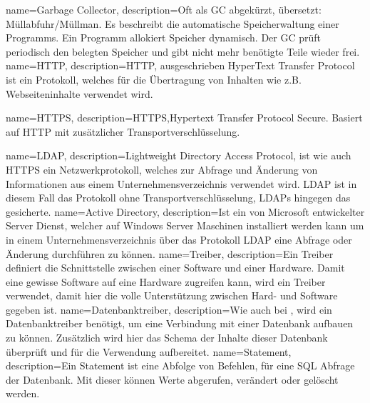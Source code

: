{
  name=Garbage Collector,
  description={Oft als GC abgekürzt, übersetzt: Müllabfuhr/Müllman. Es
               beschreibt die automatische Speicherwaltung einer Programms.
               Ein Programm allokiert Speicher dynamisch. Der GC prüft
               periodisch den belegten Speicher und gibt nicht mehr benötigte
               Teile wieder frei.}
}
{
  name=HTTP,
  description={HTTP, ausgeschrieben HyperText Transfer Protocol ist ein
              Protokoll, welches für die Übertragung von Inhalten wie z.B.
              Webseiteninhalte verwendet wird.}
}
{
  name=HTTPS,
  description={HTTPS,Hypertext Transfer Protocol Secure. Basiert auf
              \gls{HTTP} mit zusätzlicher Transportverschlüsselung.}

}
{
  name=LDAP,
  description={Lightweight Directory Access Protocol, ist wie auch \gls{HTTPS}
            ein Netzwerkprotokoll, welches zur Abfrage und Änderung von
            Informationen aus einem Unternehmensverzeichnis verwendet wird.
            LDAP ist in diesem Fall das Protokoll ohne Transportverschlüsselung,
            LDAPs hingegen das gesicherte.}
}
{
  name=Active Directory,
  description={Ist ein von Microsoft entwickelter Server Dienst, welcher auf
              Windows Server Maschinen installiert werden kann um in einem
              Unternehmensverzeichnis über das Protokoll \gls{LDAP} eine
              Abfrage oder Änderung durchführen zu können.}
}
{
  name=Treiber,
  description={Ein Treiber definiert die Schnittstelle zwischen einer
              Software und einer Hardware. Damit eine gewisse Software auf
              eine Hardware zugreifen kann, wird ein Treiber verwendet,
              damit hier die volle Unterstützung zwischen Hard- und Software
              gegeben ist.}
}
{
  name=Datenbanktreiber,
  description={Wie auch bei , wird ein
              Datenbanktreiber benötigt, um eine Verbindung mit einer
              Datenbank aufbauen zu können. Zusätzlich wird hier
              das Schema der Inhalte dieser Datenbank überprüft und
              für die Verwendung aufbereitet.}
}
{
  name=Statement,
  description={Ein Statement ist eine Abfolge von Befehlen, für eine \gls{SQL}
              Abfrage der Datenbank. Mit dieser können Werte abgerufen,
              verändert oder gelöscht werden.}
}
